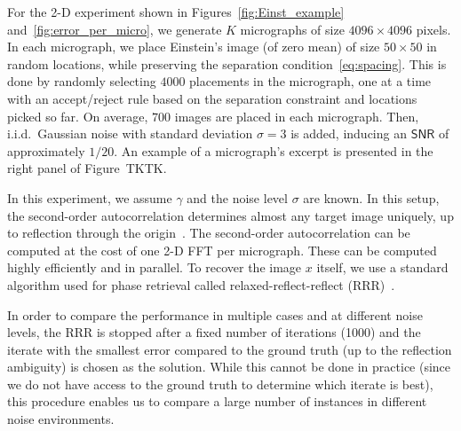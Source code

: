 \documentclass[english,11pt]{article}
\newcommand{\1}{\mathbf{1}}
\newcommand{\TODO}[1]{{\color{red}{[#1]}}}
\numberwithin{equation}{section}
\theoremstyle{plain}
\theoremstyle{definition}
\theoremstyle{remark}
\theoremstyle{plain}
\theoremstyle{remark}
\theoremstyle{plain}
\theoremstyle{plain}
\newcommand{\SNR}{\ensuremath{\textsf{SNR}}}
\begin{document}
For the 2-D experiment shown in Figures~\ref{fig:Einst_example} and~\ref{fig:error_per_micro}, we generate $K$ micrographs of size $4096\times 4096$ pixels. 
In each micrograph, we place Einstein's image (of zero mean) of size $50\times 50$  in random locations, while preserving the separation condition~\eqref{eq:spacing}.  
This is done by randomly selecting $4000$ placements in the micrograph, one at a time with
an accept/reject rule based on the separation constraint and locations picked so far.
On average, $700$ images are placed in each micrograph.   
Then, i.i.d.\ Gaussian noise with standard deviation $\sigma=3$ is added, inducing an $\SNR$ of approximately $1/20$.
An example of a micrograph's excerpt is presented in the right panel of Figure~TKTK.


In this experiment, we assume $\gamma$ and the noise level $\sigma$ are known. In this setup, the second-order autocorrelation determines almost any target image uniquely, up to reflection through the origin~\cite{hayes1982reconstruction}. The second-order autocorrelation can be computed at the cost of one 2-D FFT per micrograph. These can be computed highly efficiently and in parallel. To recover the image $x$ itself, we use a standard algorithm used for phase retrieval called relaxed-reflect-reflect (RRR)~\cite{elser2017rrr}.

%

In order to compare the performance in multiple cases and at different noise levels, the RRR is stopped after a fixed number of iterations (1000)\TODO{check} and the iterate with the smallest error compared to the ground truth (up to the reflection ambiguity) is chosen as the solution. 
While this cannot be done in practice (since we do not have access to the ground truth to determine which iterate is best), this procedure enables us to compare a large number of instances in different noise environments. \TODO{Note the last two sentences!}
\TODO{Let's try with the last iterate and see}
\end{document}
